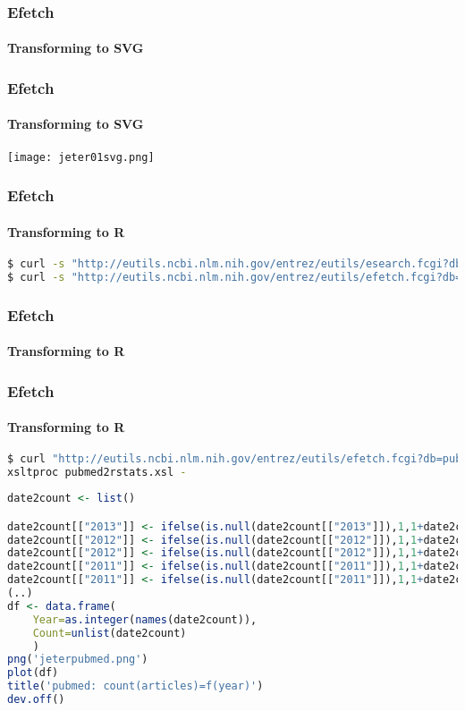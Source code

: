 \documentclass{beamer}
\begin{document}
\begin{frame}[fragile]
\frametitle{Efetch}
\framesubtitle{Transforming to SVG}

\end{frame}

\begin{frame}[fragile]
\frametitle{Efetch}
\framesubtitle{Transforming to SVG}
\begin{center}
\texttt{[image: jeter01svg.png]}
\end{center}
\end{frame}


\begin{frame}[fragile]
\frametitle{Efetch}
\framesubtitle{Transforming to R}
\begin{lstlisting}[language=bash,basicstyle=\tiny,breaklines=true,escapechar=\!]
$ curl -s "http://eutils.ncbi.nlm.nih.gov/entrez/eutils/esearch.fcgi?db=pubmed&term=Tyrannosaurus&usehistory=true" | xmllint --format -
$ curl -s "http://eutils.ncbi.nlm.nih.gov/entrez/eutils/efetch.fcgi?db=pubmed&usehistory=true&WebEnv=NCID_1_52434791_130.14.22.215_9001_1375957034_1619786167&query_key=1&retmode=xml"
\end{lstlisting}
\end{frame}


\begin{frame}[fragile]
\frametitle{Efetch}
\framesubtitle{Transforming to R}

\end{frame}

\begin{frame}[fragile]
\frametitle{Efetch}
\framesubtitle{Transforming to R}

\begin{lstlisting}[language=bash,basicstyle=\tiny,breaklines=true,escapechar=\!]
$ curl "http://eutils.ncbi.nlm.nih.gov/entrez/eutils/efetch.fcgi?db=pubmed&usehistory=true&WebEnv=NCID_1_52434791_130.14.22.215_9001_1375957034_1619786167&query_key=1&retmode=xml" |\
xsltproc pubmed2rstats.xsl -
\end{lstlisting}

\begin{lstlisting}[language=R,basicstyle=\tiny,breaklines=true,escapechar=\!]
date2count <- list()

date2count[["2013"]] <- ifelse(is.null(date2count[["2013"]]),1,1+date2count[["2013"]])
date2count[["2012"]] <- ifelse(is.null(date2count[["2012"]]),1,1+date2count[["2012"]])
date2count[["2012"]] <- ifelse(is.null(date2count[["2012"]]),1,1+date2count[["2012"]])
date2count[["2011"]] <- ifelse(is.null(date2count[["2011"]]),1,1+date2count[["2011"]])
date2count[["2011"]] <- ifelse(is.null(date2count[["2011"]]),1,1+date2count[["2011"]])
(..)
df <- data.frame(
	Year=as.integer(names(date2count)),
	Count=unlist(date2count)
	)
png('jeterpubmed.png')
plot(df)
title('pubmed: count(articles)=f(year)')
dev.off()
\end{lstlisting}

\end{frame}
\end{document}
